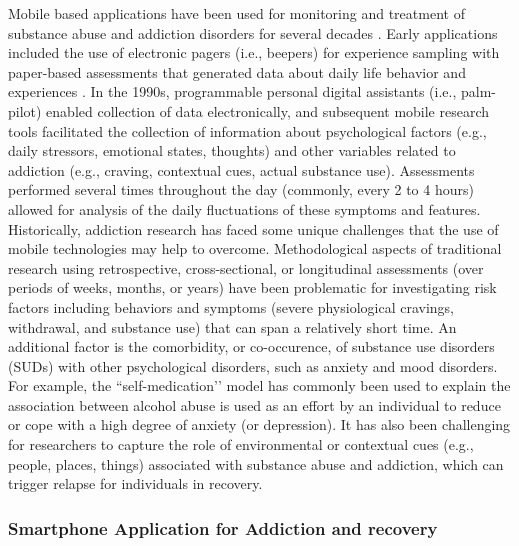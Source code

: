 \documentclass[sigconf]{acmart}
\begin{document}
Mobile based applications have been used for monitoring and treatment of 
substance abuse and addiction disorders for several decades \cite{boyer10}. 
Early applications included the use of electronic pagers (i.e., beepers) 
for experience sampling with paper-based assessments that generated data about 
daily life behavior and experiences \cite{swedenson16}. In the 1990s, programmable 
personal digital assistants (i.e., palm-pilot) enabled collection of data 
electronically, and subsequent mobile research tools facilitated the collection 
of information about psychological factors (e.g., daily stressors, emotional 
states, thoughts) and other variables related to addiction (e.g., craving, 
contextual cues, actual substance use). Assessments performed several times 
throughout the day (commonly, every 2 to 4 hours) allowed for analysis of the 
daily fluctuations of these symptoms and features. Historically, addiction 
research has faced some unique challenges that the use of mobile technologies 
may help to overcome. Methodological aspects of traditional research using 
retrospective, cross-sectional, or longitudinal assessments (over periods of 
weeks, months, or years) have been problematic for investigating risk factors 
including behaviors and symptoms (severe physiological cravings, withdrawal, 
and substance use) that can span a relatively short time. An additional factor 
is the comorbidity, or co-occurence, of substance use disorders (SUDs) with other 
psychological disorders, such as anxiety and mood disorders. For example, the 
``self-medication’’ model has commonly been used to explain the association 
between alcohol abuse is used as an effort by an individual to reduce or cope 
with a high degree of anxiety (or depression). It has also been challenging 
for researchers to capture the role of environmental or contextual cues (e.g., 
people, places, things) associated with substance abuse and addiction, which 
can trigger relapse for individuals in recovery.


\subsubsection*{Smartphone Application for Addiction and recovery}
\end{document}
